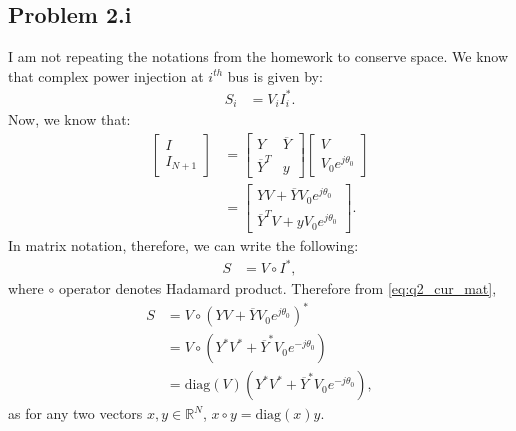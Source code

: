 \subsection*{Problem 2.i}
I am not repeating the notations from the homework to conserve space. We know that complex power injection at $i^{th}$ bus is given by:
\begin{align*}
	S_i &= V_iI_i^*.
\end{align*}
Now, we know that:
\begin{align}\label{eq:q2_cur_mat}
	\begin{bmatrix}
		I\\I_{N+1}
	\end{bmatrix} &= \begin{bmatrix}
		Y & \overline{Y}\\\overline{Y}^T & y
	\end{bmatrix} \begin{bmatrix}
		V\\V_0e^{j\theta_0}
	\end{bmatrix} \nonumber\\
	&= \begin{bmatrix}
		YV + \overline{Y}V_0e^{j\theta_0}\\
		\overline{Y}^TV + yV_0e^{j\theta_0}
	\end{bmatrix}.
\end{align}
In matrix notation, therefore, we can write the following:
\begin{align*}
	S &= V \circ I^*,
\end{align*}
where $\circ$ operator denotes Hadamard product. Therefore from \ref*{eq:q2_cur_mat},
\begin{align*}
	S &= V \circ (YV + \overline{Y}V_0e^{j\theta_0})^*\\
	&= V \circ (Y^*V^* + \overline{Y}^*V_0e^{-j\theta_0})\\
	&= \text{diag}(V)(Y^*V^* + \overline{Y}^*V_0e^{-j\theta_0}),
\end{align*}
as for any two vectors $x,y \in \mathbb{R}^N$, $x \circ y = \text{diag}(x)y$.
